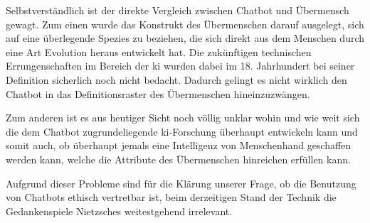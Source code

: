 Selbstverständlich ist der direkte Vergleich zwischen Chatbot und Übermensch gewagt.
Zum einen wurde das Konstrukt des Übermenschen darauf ausgelegt, sich auf eine überlegende Spezies zu beziehen, die sich direkt aus dem Menschen durch eine Art Evolution heraus entwickelt hat.
Die zukünftigen technischen Errungenschaften im Bereich der \ac{ki} wurden dabei im 18. Jahrhundert bei seiner Definition sicherlich noch nicht bedacht.   
Dadurch gelingt es nicht wirklich den Chatbot in das Definitionsraster des Übermenschen hineinzuzwängen.

Zum anderen ist es aus heutiger Sicht noch völlig unklar wohin und wie weit sich die dem Chatbot zugrundeliegende \ac{ki}-Forschung überhaupt entwickeln kann und somit auch, ob überhaupt jemals eine Intelligenz von Menschenhand geschaffen werden kann, welche die Attribute des Übermenschen hinreichen erfüllen kann.

Aufgrund dieser Probleme sind für die Klärung unserer Frage, ob die Benutzung von Chatbots ethisch vertretbar ist, beim derzeitigen Stand der Technik die Gedankenspiele Nietzsches weitestgehend irrelevant.

